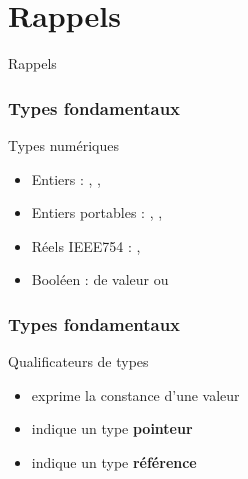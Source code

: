 \documentclass[svgnames]{beamer}
\begin{document}
\section{Rappels}
\begin{frame}[plain]
\begin{center}\Huge Rappels\end{center}
\end{frame}

\begin{frame}
  \frametitle{Types fondamentaux}
  \begin{block}{Types numériques}
  \begin{itemize}
  \footnotesize
  \item Entiers : , , 
  \item Entiers portables : , , 
  \item Réels IEEE754 : , 
  \item Booléen :  de valeur  ou 
  \end{itemize}

  \begin{overlayarea}{\textwidth}{4cm}
  \end{overlayarea}
  \end{block}
\end{frame}

\begin{frame}
  \frametitle{Types fondamentaux}
  \begin{block}{Qualificateurs de types}
  \begin{itemize}
  \item {} exprime la constance d'une valeur
  \item \cppkeyword{*} indique un type \textbf{pointeur}
  \item \cppkeyword{\&} indique un type \textbf{référence}
  \end{itemize}

  \begin{overlayarea}{\textwidth}{5cm}
  \end{overlayarea}
  \end{block}
\end{frame}
\end{document}
